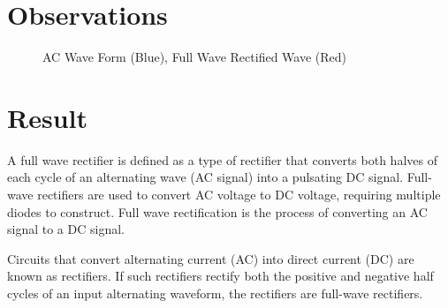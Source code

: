 	 \section{Observations}	
	 	\begin{figure}[h]
	 		\centering
	 		\caption{AC Wave Form (Blue), Full Wave Rectified Wave (Red)}
	 	\end{figure}	
 	
	 \section{Result}
	 	A full wave rectifier is defined as a type of rectifier that converts both halves of each cycle of an alternating wave (AC signal) into a pulsating DC signal. Full-wave rectifiers are used to convert AC voltage to DC voltage, requiring multiple diodes to construct. Full wave rectification is the process of converting an AC signal to a DC signal.
	 	
	 	Circuits that convert alternating current (AC) into direct current (DC) are known as rectifiers. If such rectifiers rectify both the positive and negative half cycles of an input alternating waveform, the rectifiers are full-wave rectifiers.
		
\afterpage{\clearpage}